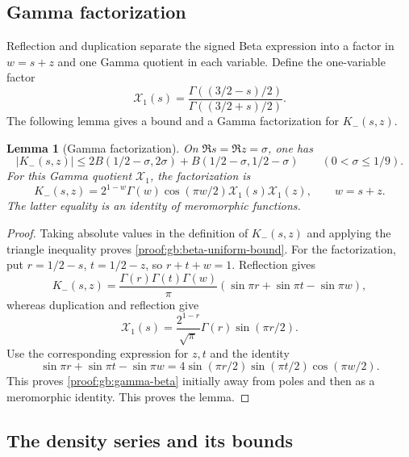\documentclass[12pt,a4paper]{amsart}
\numberwithin{equation}{section}
\def\le{\leqslant}
\theoremstyle{plain}
\newtheorem{lemma}[proposition]{Lemma}
\theoremstyle{definition}
\theoremstyle{remark}
\begin{document}
\subsection{Gamma factorization}
\label{proof:euler:gamma-section}

Reflection and duplication separate the signed Beta expression
into a factor in $w=s+z$ and one Gamma quotient in each variable.
Define the one-variable factor
\[
 \mathcal X_1(s)=\frac{\Gamma((3/2-s)/2)}{\Gamma((3/2+s)/2)}.
\]
The following lemma gives a bound and a Gamma factorization for $K_-(s,z)$.

\begin{lemma}[Gamma factorization]\label{proof:v9:gamma-factorization}
On $\Re s=\Re z=\sigma$, one has
\begin{equation}\label{proof:gb:beta-uniform-bound}
 |K_-(s,z)|\le
 2B(1/2-\sigma,2\sigma)+B(1/2-\sigma,1/2-\sigma)
 \qquad(0<\sigma\le1/9).
\end{equation}
For this Gamma quotient $\mathcal X_1$, the factorization is
\begin{equation}\label{proof:gb:gamma-beta}
 K_-(s,z)=2^{1-w}\Gamma(w)\cos(\pi w/2)
                      \mathcal X_1(s)\mathcal X_1(z),\qquad w=s+z.
\end{equation}
The latter equality is an identity of meromorphic functions.
\end{lemma}

\begin{proof}
Taking absolute values in the definition of $K_-(s,z)$ and applying
the triangle inequality proves \eqref{proof:gb:beta-uniform-bound}.
For the factorization, put $r=1/2-s$, $t=1/2-z$, so $r+t+w=1$.
Reflection gives
\[
 K_-(s,z)=\frac{\Gamma(r)\Gamma(t)\Gamma(w)}\pi
             (\sin\pi r+\sin\pi t-\sin\pi w),
\]
whereas duplication and reflection give
\[
 \mathcal X_1(s)=\frac{2^{1-r}}{\sqrt\pi}
                    \Gamma(r)\sin(\pi r/2).
\]
Use the corresponding expression for $z,t$ and the identity
\[
 \sin\pi r+\sin\pi t-\sin\pi w
 =4\sin(\pi r/2)\sin(\pi t/2)\cos(\pi w/2).
\]
This proves \eqref{proof:gb:gamma-beta} initially away from poles and
then as a meromorphic identity.
This proves the lemma.
\end{proof}

\subsection{The density series and its bounds}
\label{proof:v7:singular-series}\label{proof:v7:arithmetic-normalization}
\end{document}
